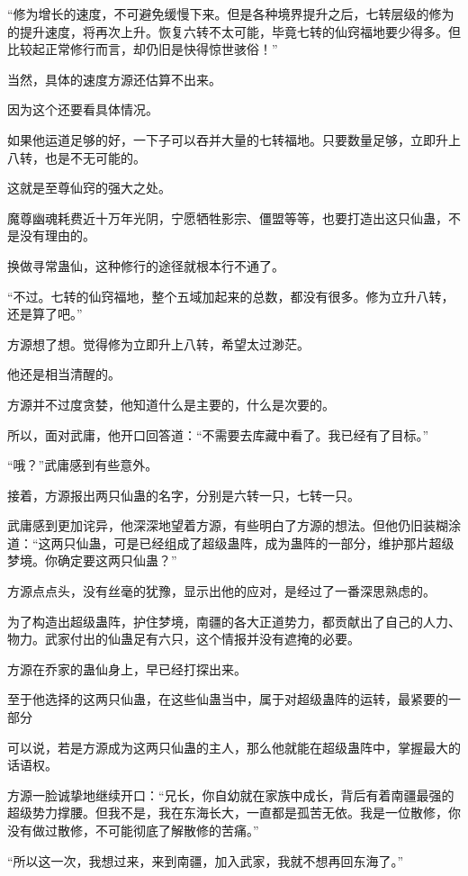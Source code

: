 \begin{this_body}
“修为增长的速度，不可避免缓慢下来。但是各种境界提升之后，七转层级的修为的提升速度，将再次上升。恢复六转不太可能，毕竟七转的仙窍福地要少得多。但比较起正常修行而言，却仍旧是快得惊世骇俗！”

当然，具体的速度方源还估算不出来。

因为这个还要看具体情况。

如果他运道足够的好，一下子可以吞并大量的七转福地。只要数量足够，立即升上八转，也是不无可能的。

这就是至尊仙窍的强大之处。

魔尊幽魂耗费近十万年光阴，宁愿牺牲影宗、僵盟等等，也要打造出这只仙蛊，不是没有理由的。

换做寻常蛊仙，这种修行的途径就根本行不通了。

“不过。七转的仙窍福地，整个五域加起来的总数，都没有很多。修为立升八转，还是算了吧。”

方源想了想。觉得修为立即升上八转，希望太过渺茫。

他还是相当清醒的。

方源并不过度贪婪，他知道什么是主要的，什么是次要的。

所以，面对武庸，他开口回答道：“不需要去库藏中看了。我已经有了目标。”

“哦？”武庸感到有些意外。

接着，方源报出两只仙蛊的名字，分别是六转一只，七转一只。

武庸感到更加诧异，他深深地望着方源，有些明白了方源的想法。但他仍旧装糊涂道：“这两只仙蛊，可是已经组成了超级蛊阵，成为蛊阵的一部分，维护那片超级梦境。你确定要这两只仙蛊？”

方源点点头，没有丝毫的犹豫，显示出他的应对，是经过了一番深思熟虑的。

为了构造出超级蛊阵，护住梦境，南疆的各大正道势力，都贡献出了自己的人力、物力。武家付出的仙蛊足有六只，这个情报并没有遮掩的必要。

方源在乔家的蛊仙身上，早已经打探出来。

至于他选择的这两只仙蛊，在这些仙蛊当中，属于对超级蛊阵的运转，最紧要的一部分

可以说，若是方源成为这两只仙蛊的主人，那么他就能在超级蛊阵中，掌握最大的话语权。

方源一脸诚挚地继续开口：“兄长，你自幼就在家族中成长，背后有着南疆最强的超级势力撑腰。但我不是，我在东海长大，一直都是孤苦无依。我是一位散修，你没有做过散修，不可能彻底了解散修的苦痛。”

“所以这一次，我想过来，来到南疆，加入武家，我就不想再回东海了。”


\end{this_body}
